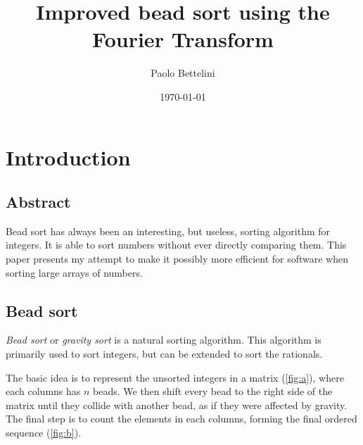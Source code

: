 \documentclass{article}
\title{Improved bead sort using the Fourier Transform}
\author{Paolo Bettelini}
\date{\today}
\begin{document}
\maketitle

\section{Introduction}

\subsection{Abstract}

Bead sort has always been an interesting, but useless, sorting algorithm
for integers. It is able to sort numbers without ever directly comparing them.
This paper presents my attempt to make it possibly more efficient
for software when sorting large arrays of numbers.

\subsection{Bead sort}

\textit{Bead sort}\cite{beadsort} or \textit{gravity sort}
is a natural sorting algorithm.
This algorithm is primarily used to sort
integers, but can be extended to sort the rationals.

The basic idea is to represent the unsorted integers
in a matrix (\ref{fig:a}), where each columns has \(n\) beads.
We then shift every bead to the right side of the matrix
until they collide with another bead,
as if they were affected by gravity.
The final step is to count the elements in each columns,
forming the final ordered sequence (\ref{fig:b}).
\end{document}
